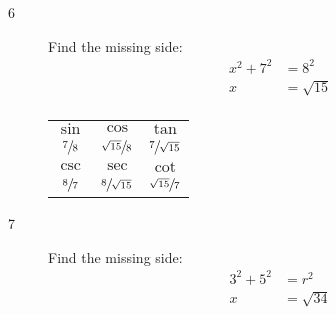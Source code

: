 \documentclass{exam}
\begin{document}
\begin{description}
\begin{tabular}[H]{ccc}
          \bottomrule
        \end{tabular}

      \item[6] 
        Find the missing side:
        \begin{align*}
          x^2 + 7^2 & = 8^2 \\
          x         & = \sqrt{15} \\
        \end{align*}

        \begin{tabular}[H]{ccc}
          \toprule

          $\sin$         & $\cos$                 & $\tan$                 \\
          $\sfrac{7}{8}$ & $\sfrac{\sqrt{15}}{8}$ & $\sfrac{7}{\sqrt{15}}$ \\

          \midrule

          $\csc$         & $\sec$                 & $\cot$ \\
          $\sfrac{8}{7}$ & $\sfrac{8}{\sqrt{15}}$ & $\sfrac{\sqrt{15}}{7}$ \\

          \bottomrule
        \end{tabular}

      \pagebreak

      \item[7]
        Find the missing side:
        \begin{align*}
          3^2 + 5^2 & = r^2 \\
          x         & = \sqrt{34} \\
        \end{align*}



\end{description}
\end{document}
